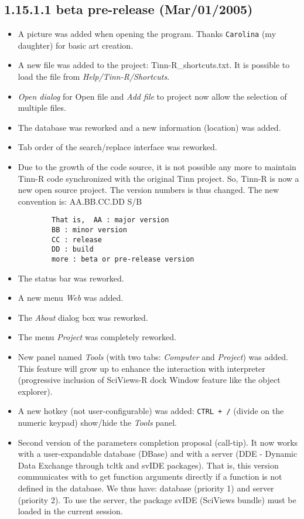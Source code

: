 \subsection*{1.15.1.1 beta pre-release (Mar/01/2005)}
\begin{itemize}
  \item A picture was added when opening the program. Thanks \texttt{Carolina} (my daughter) for basic art creation.
  \item A new file was added to the project: Tinn-R\_shortcuts.txt. It is possible to load the
    file from \textit{Help/Tinn-R/Shortcuts}.
  \item \textit{Open dialog} for Open file and \textit{Add file} to project now allow the selection of multiple files.
  \item The database was reworked and a new information (location) was added.
  \item Tab order of the search/replace interface was reworked.
  \item Due to the growth of the code source, it is not possible any more to maintain Tinn-R code synchronized 
    with the original Tinn project. So, Tinn-R is now a new open source project. 
    The version numbers is thus changed. The new convention is: AA.BB.CC.DD S/B

    \begin{footnotesize}
      \begin{verbatim}
        That is,  AA : major version
        BB : minor version
        CC : release
        DD : build
        more : beta or pre-release version
      \end{verbatim}
    \end{footnotesize}

  \item The status bar was reworked.
  \item A new menu \textit{Web} was added.
  \item The \textit{About} dialog box was reworked.
  \item The menu \textit{Project} was completely reworked.
  \item New panel named \textit{Tools} (with two tabs: \textit{Computer} and \textit{Project}) was added.
    This feature will grow up to enhance the interaction with \RR{} interpreter
    (progressive inclusion of SciViews-R dock Window feature like the object explorer).
  \item A new hotkey (not user-configurable) was added: \texttt{CTRL + /} (divide on the numeric keypad)
    show/hide the \textit{Tools} panel.
  \item Second version of the \RR{} parameters completion proposal (call-tip).
    It now works with a user-expandable database (DBase) and with a
    \RR{} server (DDE - Dynamic Data Exchange through tcltk and svIDE packages).
    That is, this version communicates with \RR{} to get \RR{} function arguments directly
    if a function is not defined in the database.
    We thus have: database (priority 1) and \RR{} server (priority 2).
    To use the \RR{} server, the package svIDE (SciViews bundle) must be loaded in the current \RR{} session.
\end{itemize}


